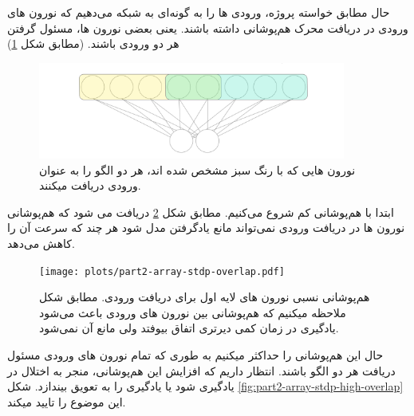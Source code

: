         حال مطابق خواسته پروژه، ورودی ها را به گونه‌ای به شبکه می‌دهیم که نورون های ورودی در دریافت محرک هم‌پوشانی داشته باشند. یعنی بعضی نورون ها، مسئول گرفتن هر دو ورودی باشند. 
        (مطابق شکل \ref{fig:part2-input-overlap})
        \begin{figure}[!ht]
            \centering
            \captionsetup{width=.9\linewidth}
            \includegraphics[width=0.9\textwidth]{images/input-overlap.png} 
            \caption{نورون هایی که با رنگ سبز مشخص شده اند، هر دو الگو را به عنوان ورودی دریافت میکنند.
            }
            \label{fig:part2-input-overlap}
        \end{figure}

        ابتدا با هم‌پوشانی کم شروع می‌کنیم. مطابق شکل
        \ref{fig:part2-array-stdp-overlap}
        دریافت می شود که هم‌پوشانی نورون ها در دریافت ورودی نمی‌تواند مانع یادگرفتن مدل شود هر چند که سرعت آن را کاهش می‌دهد.
        \begin{figure}[!ht]
            \centering
            \captionsetup{width=.9\linewidth}
            \texttt{[image: plots/part2-array-stdp-overlap.pdf]} 
            \caption{هم‌پوشانی نسبی نورون های لایه اول برای دریافت ورودی. مطابق شکل ملاحظه میکنیم که هم‌پوشانی بین نورون های ورودی باعث می‌شود یادگیری در زمان کمی دیرتری اتفاق بیوفتد ولی مانع آن نمی‌شود.
            }
            \label{fig:part2-array-stdp-overlap}
        \end{figure}

        حال این هم‌پوشانی را حداکثر میکنیم به طوری که تمام نورون های ورودی مسئول دریافت هر دو الگو باشند. انتظار داریم که افزایش این هم‌پوشانی، منجر به اختلال در یادگیری شود یا یادگیری را به تعویق بیندازد. شکل
        \ref{fig:part2-array-stdp-high-overlap}
        این موضوع را تایید میکند.

